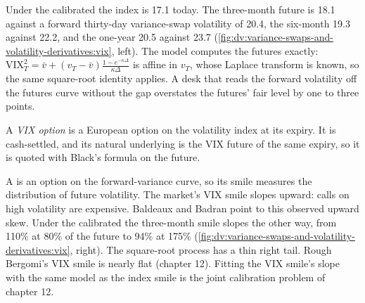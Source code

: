 \begin{example}\label{ex:dv:variance-swaps-and-volatility-derivatives:vixcurve}
Under the calibrated  the index is 17.1 today. The three-month future is 18.1 against a forward
thirty-day variance-swap volatility of 20.4, the six-month 19.3 against 22.2, and the one-year 20.5 against 23.7
(\cref{fig:dv:variance-swaps-and-volatility-derivatives:vix}, left). The model computes the futures exactly:
$\mathrm{VIX}_T^2=\bar v+(v_T-\bar v)\frac{1-e^{-\kappa\Delta}}{\kappa\Delta}$ is affine in $v_T$, whose Laplace
transform is known, so the same square-root identity applies. A desk that reads the forward volatility off the
futures curve without the gap overstates the futures' fair level by one to three points.
\end{example}

\begin{definition}\label{def:dv:variance-swaps-and-volatility-derivatives:vixopt}
A \emph{VIX option} is a European option on the volatility index at its expiry. It is
cash-settled, and its natural underlying is the VIX future of the same expiry, so it is quoted with Black's
formula on the future.
\end{definition}

A  is an option on the forward-variance curve, so its smile measures the distribution of future
volatility. The market's VIX smile slopes upward: calls on high volatility are expensive. Baldeaux and Badran
point to this observed upward skew. Under the calibrated  the three-month smile slopes the other way,
from 110\% at 80\% of the future to 94\% at 175\%
(\cref{fig:dv:variance-swaps-and-volatility-derivatives:vix}, right). The square-root process has a thin right
tail. Rough Bergomi's VIX smile is nearly flat (chapter 12). Fitting the VIX smile's slope with the same model as
the index smile is the joint calibration problem of chapter 12.

